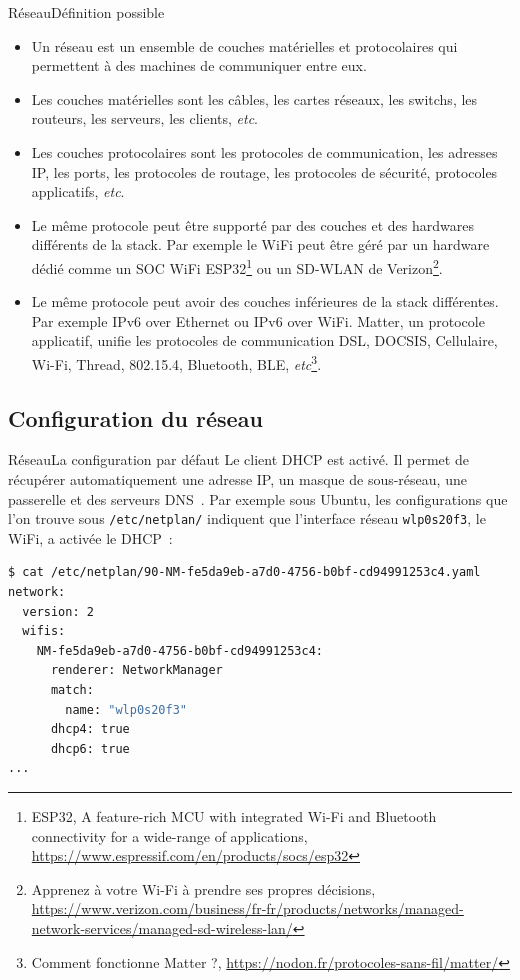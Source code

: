 \documentclass{beamer}
\begin{document}
    \begin{frame}{Réseau}{Définition possible}
        \begin{scriptsize}
            \begin{itemize}
                \item Un réseau est un ensemble de couches matérielles et protocolaires qui permettent à des machines de communiquer entre eux.
                \item Les couches matérielles sont les câbles, les cartes réseaux, les switchs, les routeurs, les serveurs, les clients, \textit{etc}.
                \item Les couches protocolaires sont les protocoles de communication, les adresses IP, les ports, les protocoles de routage, les protocoles de sécurité, protocoles applicatifs, \textit{etc}.
                \item Le même protocole peut être supporté par des couches et des hardwares différents de la stack.
                Par exemple le WiFi peut être géré par un hardware dédié comme un SOC WiFi ESP32\footnote{ESP32, A feature-rich MCU with integrated Wi-Fi and Bluetooth connectivity for a wide-range of applications, \url{https://www.espressif.com/en/products/socs/esp32}} ou un SD-WLAN de Verizon\footnote{Apprenez à votre Wi-Fi à prendre ses propres décisions, \url{https://www.verizon.com/business/fr-fr/products/networks/managed-network-services/managed-sd-wireless-lan/}}.
                \item Le même protocole peut avoir des couches inférieures de la stack différentes.
                Par exemple IPv6 over Ethernet ou IPv6 over WiFi.
                Matter, un protocole applicatif, unifie les protocoles de communication DSL, DOCSIS, Cellulaire, Wi-Fi, Thread, 802.15.4, Bluetooth, BLE, \textit{etc}\footnote{Comment fonctionne Matter ?, \url{https://nodon.fr/protocoles-sans-fil/matter/}}.
            \end{itemize}
        \end{scriptsize}
    \end{frame}

    \subsection{Configuration du réseau}\label{subsec:network-configuration}

    \begin{frame}[fragile]{Réseau}{La configuration par défaut}
        Le client DHCP est activé.
        Il permet de récupérer automatiquement une adresse IP, un masque de sous-réseau, une passerelle et des serveurs DNS~.
        Par exemple sous Ubuntu, les configurations que l'on trouve sous \lstinline{/etc/netplan/} indiquent que l'interface réseau \lstinline{wlp0s20f3}, le WiFi, a activée le DHCP~:
        \begin{lstlisting}[language=bash]
$ cat /etc/netplan/90-NM-fe5da9eb-a7d0-4756-b0bf-cd94991253c4.yaml
network:
  version: 2
  wifis:
    NM-fe5da9eb-a7d0-4756-b0bf-cd94991253c4:
      renderer: NetworkManager
      match:
        name: "wlp0s20f3"
      dhcp4: true
      dhcp6: true
...
        \end{lstlisting}
    \end{frame}
\end{document}

